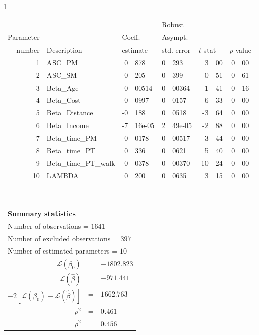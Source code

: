   \begin{tabular}{l}
\begin{tabular}{rlr@{.}lr@{.}lr@{.}lr@{.}l}
         &                       &   \multicolumn{2}{l}{}    & \multicolumn{2}{l}{Robust}  &     \multicolumn{4}{l}{}   \\
Parameter &                       &   \multicolumn{2}{l}{Coeff.}      & \multicolumn{2}{l}{Asympt.}  &     \multicolumn{4}{l}{}   \\
number &  Description                     &   \multicolumn{2}{l}{estimate}      & \multicolumn{2}{l}{std. error}  &   \multicolumn{2}{l}{$t$-stat}  &   \multicolumn{2}{l}{$p$-value}   \\

\hline

1 & ASC_PM  & 0&878 & 0&293 & 3&00 & 0&00\\
2 & ASC_SM & -0&205 & 0&399 & -0&51 & 0&61\\
3 & Beta_Age & -0&00514 & 0&00364 & -1&41 & 0&16\\
4 & Beta_Cost & -0&0997 & 0&0157 & -6&33 & 0&00\\
5 & Beta_Distance & -0&188 & 0&0518 & -3&64 & 0&00\\
6 & Beta_Income & -7&16e-05 & 2&49e-05 & -2&88 & 0&00\\
7 & Beta_time_PM & -0&0178 & 0&00517 & -3&44 & 0&00\\
8 & Beta_time_PT & 0&336 & 0&0621 & 5&40 & 0&00\\
9 & Beta_time_PT_walk & -0&0378 & 0&00370 & -10&24 & 0&00\\
10 & LAMBDA & 0&200 & 0&0635 & 3&15 & 0&00\\
\hline
\end{tabular}
\\
\begin{tabular}{rcl}
\multicolumn{3}{l}{\bf Summary statistics}\\
\multicolumn{3}{l}{ Number of observations = $1641$} \\
\multicolumn{3}{l}{ Number of excluded observations = $397$} \\
\multicolumn{3}{l}{ Number of estimated  parameters = $10$} \\
 $\mathcal{L}(\beta_0)$ &=&  $-1802.823$ \\
 $\mathcal{L}(\hat{\beta})$ &=& $-971.441 $  \\
 $-2[\mathcal{L}(\beta_0) -\mathcal{L}(\hat{\beta})]$ &=& $1662.763$ \\
    $\rho^2$ &=&   $0.461$ \\
    $\bar{\rho}^2$ &=&    $0.456$ \\
\end{tabular}
  \end{tabular}
